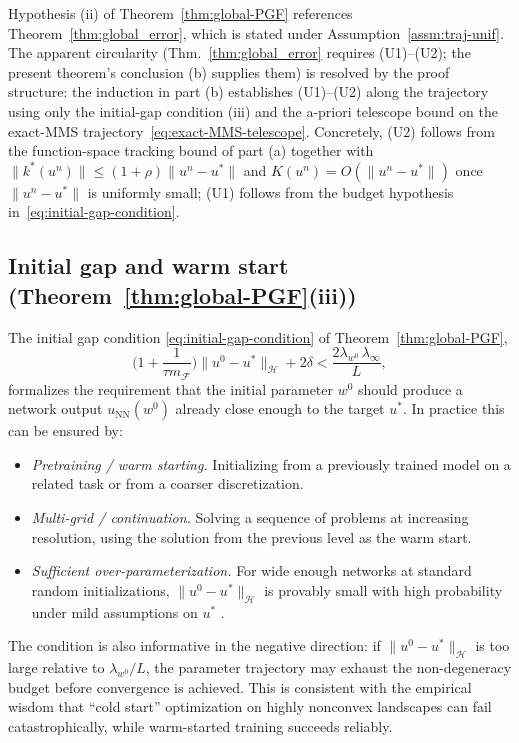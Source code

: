\documentclass[twoside,11pt]{article}
\newcommand{\NN}{\mathrm{NN}}
\newcommand{\calF}{\mathcal{F}}
\newcommand{\calH}{\mathcal{H}}
\begin{document}
\begin{remark}\label{rem:globalPGF-traj-unif}
Hypothesis (ii) of Theorem~\ref{thm:global-PGF} references Theorem~\ref{thm:global_error}, which is stated under Assumption~\ref{assm:traj-unif}. The apparent circularity (Thm.~\ref{thm:global_error} requires (U1)--(U2); the present theorem's conclusion (b) supplies them) is resolved by the proof structure: the induction in part (b) establishes (U1)--(U2) along the trajectory using only the initial-gap condition (iii) and the a-priori telescope bound on the exact-MMS trajectory~\eqref{eq:exact-MMS-telescope}. Concretely, (U2) follows from the function-space tracking bound of part (a) together with $\|k^*(u^n)\|\le(1+\rho)\|u^n-u^*\|$ and $K(u^n)=O(\|u^n-u^*\|)$ once $\|u^n-u^*\|$ is uniformly small; (U1) follows from the budget hypothesis in~\eqref{eq:initial-gap-condition}.
\end{remark}

\subsection{Initial gap and warm start (Theorem~\ref{thm:global-PGF}(iii))}\label{app:disc-initial-gap}

The initial gap condition \eqref{eq:initial-gap-condition} of Theorem~\ref{thm:global-PGF},
\[
\Big(1+\frac{1}{\tau m_\calF}\Big)\|u^0-u^*\|_\calH + 2\delta < \frac{2\lambda_{w^0}\,\lambda_\infty}{L},
\]
formalizes the requirement that the initial parameter $w^0$ should produce a network output
$u_\NN(w^0)$ already close enough to the target $u^*$. In practice this can be ensured by:
\begin{itemize}
\item \emph{Pretraining / warm starting.} Initializing from a previously trained model on
a related task or from a coarser discretization.
\item \emph{Multi-grid / continuation.} Solving a sequence of problems at increasing
resolution, using the solution from the previous level as the warm start.
\item \emph{Sufficient over-parameterization.} For wide enough networks at standard
random initializations, $\|u^0-u^*\|_\calH$ is provably small with high probability under
mild assumptions on $u^*$ \citep{jacot2018neural,du2018gradient}.
\end{itemize}

The condition is also informative in the negative direction: if $\|u^0-u^*\|_\calH$ is too
large relative to $\lambda_{w^0}/L$, the parameter trajectory may exhaust the non-degeneracy
budget before convergence is achieved. This is consistent with the empirical wisdom that
``cold start'' optimization on highly nonconvex landscapes can fail catastrophically,
while warm-started training succeeds reliably.
\end{document}
